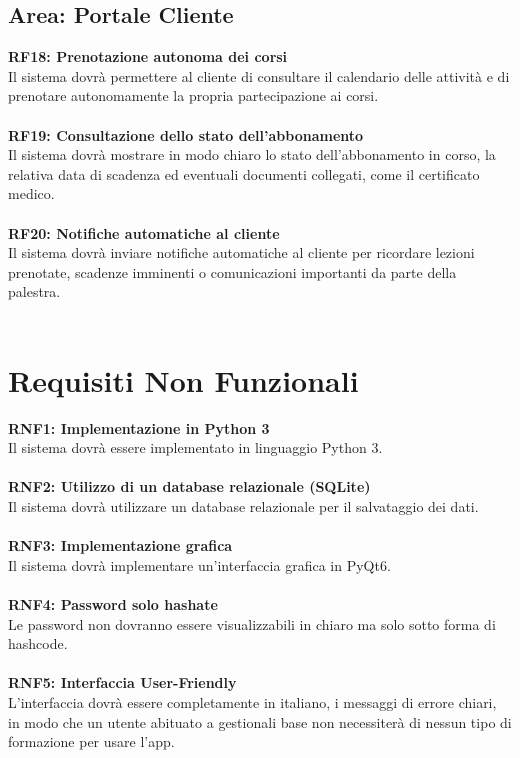 \documentclass[12pt,a4paper]{report}
\begin{document}
\subsection{Area: Portale Cliente}

\noindent\textbf{RF18: Prenotazione autonoma dei corsi}\\
Il sistema dovrà permettere al cliente di consultare il calendario delle attività e di prenotare autonomamente la propria partecipazione ai corsi.\\
\\
\noindent\textbf{RF19: Consultazione dello stato dell'abbonamento}\\
Il sistema dovrà mostrare in modo chiaro lo stato dell'abbonamento in corso, la relativa data di scadenza ed eventuali documenti collegati, come il certificato medico.\\
\\
\noindent\textbf{RF20: Notifiche automatiche al cliente}\\
Il sistema dovrà inviare notifiche automatiche al cliente per ricordare lezioni prenotate, scadenze imminenti o comunicazioni importanti da parte della palestra.\\
\\


\section{Requisiti Non Funzionali}
\noindent\textbf{RNF1: Implementazione in Python 3}\\
Il sistema dovrà essere implementato in linguaggio Python 3.\\
\\
\noindent\textbf{RNF2: Utilizzo di un database relazionale (SQLite)}\\
Il sistema dovrà utilizzare un database relazionale per il salvataggio dei dati.\\
\\
\noindent\textbf{RNF3: Implementazione grafica}\\
Il sistema dovrà implementare un'interfaccia grafica in PyQt6.\\
\\
\noindent\textbf{RNF4: Password solo hashate}\\ 
Le password non dovranno essere visualizzabili in chiaro ma solo sotto forma di hashcode.\\
\\
\noindent\textbf{RNF5: Interfaccia User-Friendly}\\
L'interfaccia dovrà essere completamente in italiano, i messaggi di errore chiari, in modo che un utente abituato a gestionali base non necessiterà di nessun tipo di formazione per usare l'app.\\
\\
\end{document}
